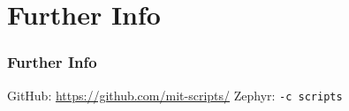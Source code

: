 \section{Further Info}
\begin{frame}
  \frametitle{Further Info}
  GitHub: \url{https://github.com/mit-scripts/}
  Zephyr: \texttt{-c scripts}
\end{frame}
